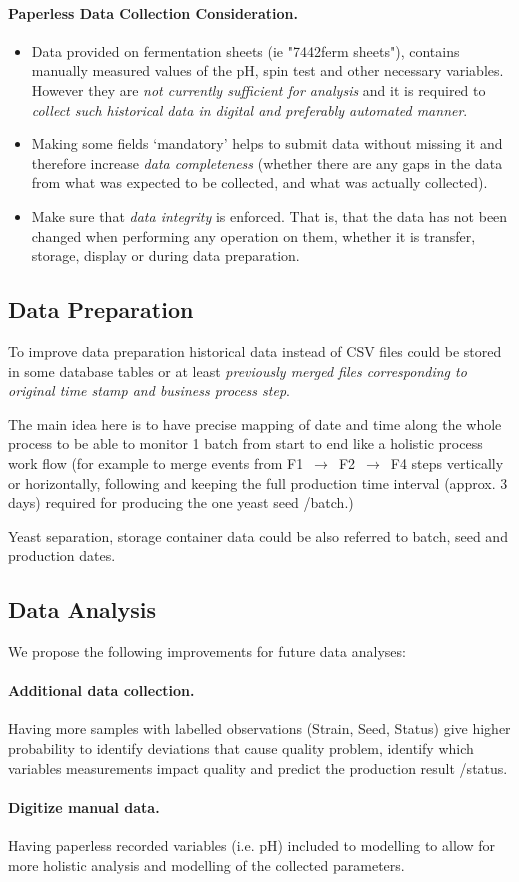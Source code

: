 \paragraph{Paperless Data Collection Consideration.}
\begin{itemize}
    \item Data provided on fermentation sheets (ie "7442ferm sheets"), contains manually measured values of the pH, spin test and other necessary variables. However they are \emph{not currently sufficient for analysis} and it is required to \emph{collect such historical data in digital and preferably automated manner}. 
    \item Making some fields ‘mandatory’ helps to submit data without missing it and therefore increase \emph{data completeness} (whether there are any gaps in the data from what was expected to be collected, and what was actually collected).
    \item Make sure that \emph{data integrity} is enforced. That is, that the data has not been changed when performing any operation on them, whether it is transfer, storage, display or during data preparation.
\end{itemize}

\subsection{Data Preparation}
To improve data preparation historical data instead of CSV files could be stored in some database tables or at least \emph{previously merged files corresponding to original time stamp and business process step}.

The main idea here is to have  precise mapping of date and time along the whole process to be able to monitor 1 batch from start to end like a holistic process work flow (for example to merge events from F1 $\,\to\,$ F2 $\,\to\,$ F4 steps vertically or horizontally, following and keeping  the full production time interval (approx. 3 days) required for producing the one yeast seed /batch.) 

Yeast separation, storage container data could be also referred to batch, seed and production dates. 

\subsection{Data Analysis}
We propose the following improvements for future data analyses:

\paragraph{Additional data collection.} Having more samples with labelled observations (Strain, Seed, Status) give higher probability to identify deviations that cause quality problem, identify which variables measurements impact quality and predict the production result /status.
\paragraph{Digitize manual data.} Having paperless recorded variables (i.e. pH) included to modelling to allow for more holistic analysis and modelling of the collected parameters. 
